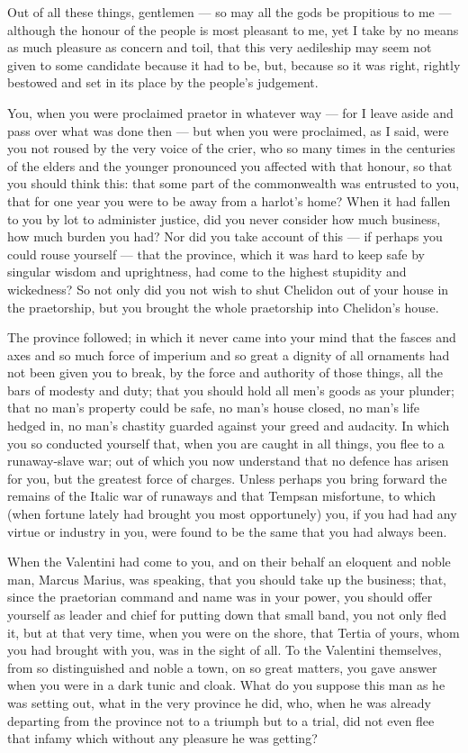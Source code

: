  Out of all these things, gentlemen --- so may all the gods be propitious to me --- although the honour of the people is most pleasant to me, yet I take by no means as much pleasure as concern and toil, that this very aedileship may seem not given to some candidate because it had to be, but, because so it was right, rightly bestowed and set in its place by the people's judgement.

 You, when you were proclaimed praetor in whatever way --- for I leave aside and pass over what was done then --- but when you were proclaimed, as I said, were you not roused by the very voice of the crier, who so many times in the centuries of the elders and the younger pronounced you affected with that honour, so that you should think this: that some part of the commonwealth was entrusted to you, that for one year you were to be away from a harlot's home? When it had fallen to you by lot to administer justice, did you never consider how much business, how much burden you had? Nor did you take account of this --- if perhaps you could rouse yourself --- that the province, which it was hard to keep safe by singular wisdom and uprightness, had come to the highest stupidity and wickedness? So not only did you not wish to shut Chelidon out of your house in the praetorship, but you brought the whole praetorship into Chelidon's house.

 The province followed; in which it never came into your mind that the fasces and axes and so much force of imperium and so great a dignity of all ornaments had not been given you to break, by the force and authority of those things, all the bars of modesty and duty; that you should hold all men's goods as your plunder; that no man's property could be safe, no man's house closed, no man's life hedged in, no man's chastity guarded against your greed and audacity. In which you so conducted yourself that, when you are caught in all things, you flee to a runaway-slave war; out of which you now understand that no defence has arisen for you, but the greatest force of charges. Unless perhaps you bring forward the remains of the Italic war of runaways and that Tempsan misfortune, to which (when fortune lately had brought you most opportunely) you, if you had had any virtue or industry in you, were found to be the same that you had always been.

 When the Valentini had come to you, and on their behalf an eloquent and noble man, Marcus Marius, was speaking, that you should take up the business; that, since the praetorian command and name was in your power, you should offer yourself as leader and chief for putting down that small band, you not only fled it, but at that very time, when you were on the shore, that Tertia of yours, whom you had brought with you, was in the sight of all. To the Valentini themselves, from so distinguished and noble a town, on so great matters, you gave answer when you were in a dark tunic and cloak. What do you suppose this man as he was setting out, what in the very province he did, who, when he was already departing from the province not to a triumph but to a trial, did not even flee that infamy which without any pleasure he was getting?

